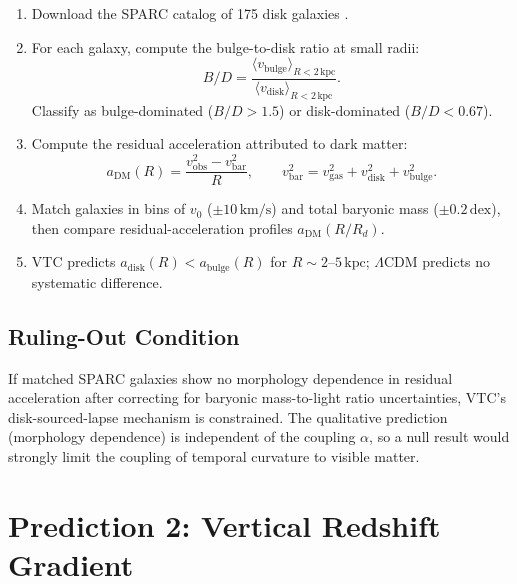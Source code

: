 \documentclass[11pt,a4paper]{article}
\theoremstyle{definition}
\newcommand{\DM}{\mathrm{DM}}
\newcommand{\bulge}{\mathrm{bulge}}
\newcommand{\disk}{\mathrm{disk}}
\newcommand{\obs}{\mathrm{obs}}
\newcommand{\barvar}{\mathrm{bar}}
\newcommand{\gas}{\mathrm{gas}}
\begin{document}
\begin{enumerate}
    \item Download the SPARC catalog of 175 disk galaxies \cite{Lelli2016}.
    \item For each galaxy, compute the bulge-to-disk ratio at small radii:
    \begin{equation}
        B/D = \frac{\langle v_{\bulge}\rangle_{R<2\,\mathrm{kpc}}}{\langle v_{\disk}\rangle_{R<2\,\mathrm{kpc}}}.
    \end{equation}
    Classify as bulge-dominated ($B/D>1.5$) or disk-dominated ($B/D<0.67$).
    \item Compute the residual acceleration attributed to dark matter:
    \begin{equation}
        a_{\DM}(R) = \frac{v_{\obs}^2 - v_{\barvar}^2}{R},\qquad v_{\barvar}^2=v_{\gas}^2+v_{\disk}^2+v_{\bulge}^2.
    \end{equation}
    \item Match galaxies in bins of $v_0$ ($\pm 10\,\mathrm{km/s}$) and total baryonic mass ($\pm 0.2\,\mathrm{dex}$), then compare residual-acceleration profiles $a_{\DM}(R/R_d)$.
    \item VTC predicts $a_{\disk}(R) < a_{\bulge}(R)$ for $R\sim 2$--$5\,\mathrm{kpc}$; $\Lambda$CDM predicts no systematic difference.
\end{enumerate}

\subsection{Ruling-Out Condition}

If matched SPARC galaxies show no morphology dependence in residual acceleration after correcting for baryonic mass-to-light ratio uncertainties, VTC's disk-sourced-lapse mechanism is constrained. The qualitative prediction (morphology dependence) is independent of the coupling $\alpha$, so a null result would strongly limit the coupling of temporal curvature to visible matter.

\section{Prediction 2: Vertical Redshift Gradient}
\end{document}

